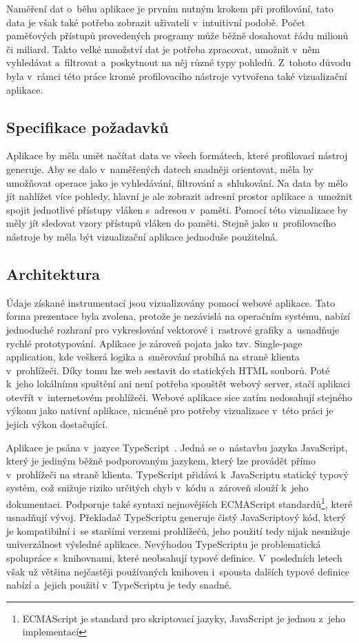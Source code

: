Naměření dat o~běhu aplikace je prvním nutným krokem při profilování, tato data je však také potřeba zobrazit uživateli v~intuitivní podobě. Počet paměťových přístupů provedených programy může běžně dosahovat řádu milionů či miliard. Takto velké množství dat je potřeba zpracovat, umožnit v~něm vyhledávat a~filtrovat a~poskytnout na něj různé typy pohledů. Z~tohoto důvodu byla v~rámci této práce kromě profilovacího nástroje vytvořena také vizualizační aplikace.

\subsection{Specifikace požadavků}
Aplikace by měla umět načítat data ve všech formátech, které profilovací nástroj generuje. Aby se dalo v~naměřených datech snadněji orientovat, měla by umožňovat operace jako je vyhledávání, filtrování a~shlukování. Na data by mělo jít nahlížet více pohledy, hlavní je ale zobrazit adresní prostor aplikace a~umožnit spojit jednotlivé přístupy vláken s~adresou v~paměti. Pomocí této vizualizace by měly jít sledovat vzory přístupů vláken do paměti. Stejně jako u~profilovacího nástroje by měla být vizualizační aplikace jednoduše použitelná.

\subsection{Architektura}
Údaje získané instrumentací jsou vizualizovány pomocí webové aplikace. Tato forma prezentace byla zvolena, protože je nezávislá na operačním systému, nabízí jednoduché rozhraní pro vykreslování vektorové i~rastrové grafiky a~usnadňuje rychlé prototypování. Aplikace je zároveň pojata jako tzv. Single-page application, kde veškerá logika a~směrování probíhá na straně klienta v~prohlížeči. Díky tomu lze web sestavit do statických HTML souborů. Poté k~jeho lokálnímu spuštění ani není potřeba spouštět webový server, stačí aplikaci otevřít v~internetovém prohlížeči. Webové aplikace sice zatím nedosahují stejného výkonu jako nativní aplikace, nicméně pro potřeby vizualizace v~této práci je jejich výkon dostačující.

Aplikace je psána v~jazyce TypeScript~\cite{typescript}. Jedná se o~nástavbu jazyka JavaScript, který je jediným běžně podporovaným jazykem, který lze provádět přímo v~prohlížeči na straně klienta. TypeScript přidává k~JavaScriptu statický typový systém, což snižuje riziko určitých chyb v~kódu a~zároveň slouží k~jeho dokumentaci. Podporuje také syntaxi nejnovějších ECMAScript standardů\footnote{ECMAScript je standard pro skriptovací jazyky, JavaScript je jednou z~jeho implementací}, které usnadňují vývoj. Překladač TypeScriptu generuje čistý JavaScriptový kód, který je kompatibilní i~se staršími verzemi prohlížečů, jeho použití tedy nijak nesnižuje univerzálnost výsledné aplikace. Nevýhodou TypeScriptu je problematická spolupráce s~knihovnami, které neobsahují typové definice. V~posledních letech však už většina nejčastěji používaných knihoven i~spousta dalších typové definice nabízí a~jejich použití v~TypeScriptu je tedy snadné.

